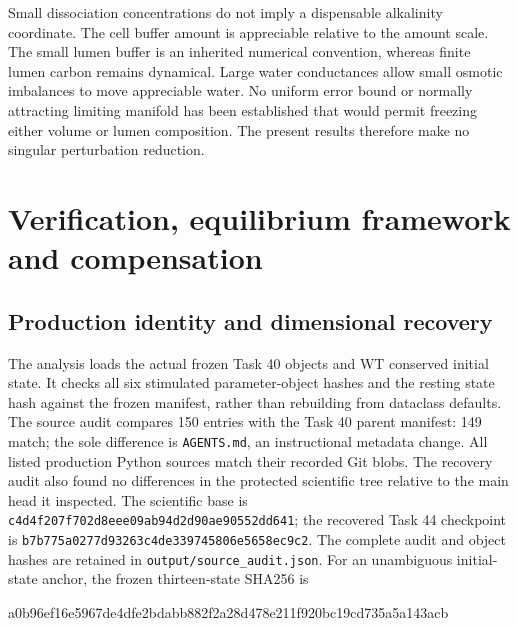 Small dissociation concentrations do not imply a dispensable alkalinity
coordinate. The cell buffer amount is appreciable relative to the amount
scale. The small lumen buffer is an inherited numerical convention, whereas
finite lumen carbon remains dynamical. Large water conductances allow small
osmotic imbalances to move appreciable water. No uniform error bound or
normally attracting limiting manifold has been established that would permit
freezing either volume or lumen composition. The present results therefore
make no singular perturbation reduction.


\section{Verification, equilibrium framework and compensation}
\label{m44sec:integrated-context}

\subsection{Production identity and dimensional recovery}
The analysis loads the actual frozen Task 40 objects and WT conserved initial
state. It checks all six stimulated parameter-object hashes and the resting
state hash against the frozen manifest, rather than rebuilding from dataclass
defaults. The source audit compares 150 entries with the Task 40 parent
manifest: 149 match; the sole difference is \texttt{AGENTS.md}, an instructional
metadata change. All listed production Python sources match their recorded
Git blobs. The recovery audit also found no differences in the protected
scientific tree relative to the main head it inspected. The scientific base
is \texttt{c4d4f207f702d8eee09ab94d2d90ae90552dd641}; the recovered Task 44
checkpoint is \texttt{b7b775a0277d93263c4de339745806e5658ec9c2}.
The complete audit and object hashes are retained in
\texttt{output/source\_audit.json}. For an unambiguous initial-state anchor,
the frozen thirteen-state SHA256 is
\begin{center}\footnotesize\ttfamily
a0b96ef16e5967de4dfe2bdabb882f2a28d478e211f920bc19cd735a5a143acb
\end{center}

